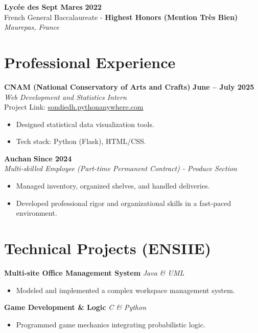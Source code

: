 \documentclass[10pt, a4paper]{article}
\begin{document}
\vspace{4pt}
\textbf{Lycée des Sept Mares} \hfill \textbf{2022} \\
French General Baccalaureate - \textbf{Highest Honors (Mention Très Bien)} \hfill \textit{Maurepas, France}

\section{Professional Experience}

\textbf{CNAM (National Conservatory of Arts and Crafts)} \hfill \textbf{June -- July 2025} \\
\textit{Web Development and Statistics Intern} \\
Project Link: \href{https://sondiedh.pythonanywhere.com}{sondiedh.pythonanywhere.com}
\begin{itemize}
    \item Designed statistical data visualization tools.
    \item Tech stack: Python (Flask), HTML/CSS.
\end{itemize}

\vspace{6pt}

\textbf{Auchan} \hfill \textbf{Since 2024} \\
\textit{Multi-skilled Employee (Part-time Permanent Contract) - Produce Section}
\begin{itemize}
    \item Managed inventory, organized shelves, and handled deliveries.
    \item Developed professional rigor and organizational skills in a fast-paced environment.
\end{itemize}

\section{Technical Projects (ENSIIE)}

\textbf{Multi-site Office Management System} \hfill \textit{Java \& UML}
\begin{itemize}
    \item Modeled and implemented a complex workspace management system.
\end{itemize}

\vspace{6pt}

\textbf{Game Development \& Logic} \hfill \textit{C \& Python}
\begin{itemize}
    \item Programmed game mechanics integrating probabilistic logic.
\end{itemize}
\end{document}
